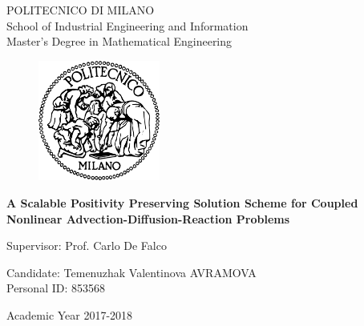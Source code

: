 \thispagestyle{empty}

\vspace*{-1.5cm} 
\begin{bfseries}

\begin{center}
	\Large
	POLITECNICO DI MILANO\\
	\Large
	School of Industrial Engineering and Information\\
	Master's Degree in Mathematical Engineering\\
	\begin{figure}[htbp]
		\begin{center}
			\includegraphics[width=4cm]{logopoli}
		\end{center}
	\end{figure}
	\vspace*{0.3cm} \LARGE		
	\textbf{A Scalable Positivity Preserving Solution Scheme for Coupled Nonlinear Advection-Diffusion-Reaction Problems}\\		
\end{center}
\vspace*{3.0cm}

\end{bfseries}

\vspace*{2cm}	
\begin{flushleft}
	\Large
	Supervisor: Prof. Carlo De Falco \\
\end{flushleft}
\vspace*{1.4cm}
	
\begin{flushright}
	\Large
	Candidate: Temenuzhak Valentinova AVRAMOVA\\
	Personal ID:  853568\\ 
\end{flushright}	
\vspace*{1.7cm}
	
\begin{center}		
	\Large
	Academic Year 2017-2018
\end{center} \clearpage








